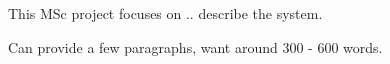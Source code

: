 This MSc project focuses on .. describe the system.  

Can provide a few paragraphs, want around 300 - 600 words.